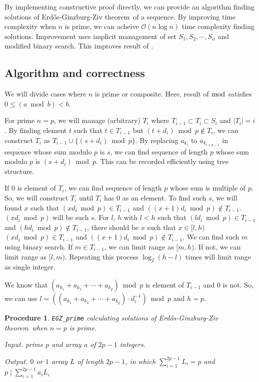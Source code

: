 \documentclass[11pt]{article}
\newtheorem{procedure}{Procedure}
\newcommand{\EGZT}{Erd\H{o}s-Ginzburg-Ziv theorem}
\begin{document}
By implementing constructive proof directly, we can provide an algorithm finding solutions of \EGZT\ of a sequence. By improving time complexity when $n$ is prime, we can acheive $\mathcal{O}(n \log n)$ time complexity finding solutions. Improvement uses implicit management of set $S_{1}, S_{2}, \cdots, S_{n}$ and modified binary search. This improves result of \cite{DELLUNGO20092658}.

\subsection{Algorithm and correctness}

We will divide cases where $n$ is prime or composite. Here, result of $\bmod$ satisfies $0 \le (a \bmod b) < b$. 

For prime $n = p$, we will manage (arbitrary) $T_i$ where $T_{i-1} \subset T_i \subset S_i$ and $|T_i| = i$. By finding element $t$ such that $t \in T_{i-1}$ but $(t + d_i) \bmod p \not \in T_i$, we can construct $T_i$ as $T_{i-1} \cup \{(s + d_i) \bmod p\}$. By replacing $a_{k_i}$ to $a_{k_{i+p-1}}$ in sequence whose sum modulo $p$ is $s$, we can find sequence of length $p$ whose sum modulo $p$ is $(s+d_i) \bmod p$. This can be recorded efficiently using tree structure.

If $0$ is element of $T_i$, we can find sequence of length $p$ whose sum is multiple of $p$. So, we will construct $T_i$ until $T_i$ has 0 as an element. To find such $s$, we will found $x$ such that $(xd_i \bmod p) \in T_{i-1}$ and $((x+1)d_i \bmod p) \not \in T_{i-1}$. $(xd_i \bmod p)$ will be such $s$. 
For $l$, $h$ with $l < h$ such that $(ld_i \bmod p) \in T_{i-1}$ and $(hd_i \bmod p) \not \in T_{i-1}$, there should be $x$ such that $x \in [l, h)$ $(xd_i \bmod p) \in T_{i-1}$ and $((x+1)d_i \bmod p) \not \in T_{i-1}$. We can find such $m$ using binary search. If $m \in T_{i-1}$, we can limit range as $[m, h)$. If not, we can limit range as $[l, m)$. Repeating this process $\log_2 (h-l)$ times will limit range as single integer.

We know that $(a_{k_1} + a_{k_2} + \cdots + a_{k_p}) \bmod p$ is element of $T_{i-1}$ and $0$ is not. So, we can use $l = ((a_{k_1} + a_{k_2} + \cdots + a_{k_p}) \cdot d_i^{-1}) \bmod p$ and $h = p$.


\begin{procedure} \texttt{EGZ\_prime} calculating solutions of \EGZT\ when $n=p$ is prime.

Input. prime $p$ and array $a$ of $2p-1$ integers.

Output. $0$ or $1$ array $L$ of length $2p-1$, in which $\sum_{i=1}^{2p-1} {L}_{i} = p$ and $p \mid \sum_{i=1}^{2p-1} {a}_{i}{L}_{i}$


\end{procedure}
\end{document}
